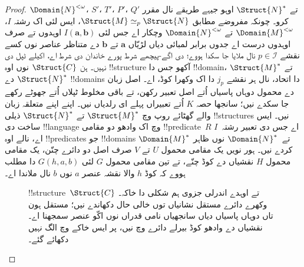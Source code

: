 \documentclass[../../../include/open-logic-section]{subfiles}
\begin{document}
\begin{proof}
$\Domain{N}^{<\omega}$، $S'$، $T'$، $P'$، $Q'$ تے
$\Struct{N}^*$ اوہو جیہے طریقے نال مقرر کرو۔ چونکہ مفروضے
مطابق $\Struct{M} \simeq_p
\Struct{N}$، ایس لئی اک رشتہ $I$،
$\Domain{M}^{<\omega}$ تے
$\Domain{N}^{<\omega}$ وچکار اے جس لئی
$I(\mathbf{a}, \mathbf{b})$ اوہدوں تے صرف اوہدوں درست اے
جدوں برابر لمبائی دیاں لڑیّاں $\mathbf{a}$ تے $\mathbf{b}$
دے متناظر عناصر نوں کسے نقشے $p\in\mathcal{I}$ نال ملایا جا سکدا ہووے؛
 دی اگے-پیچھے شرط
پورے خاندان دی شرط اے، اکیلے ٹپل دی نہیں۔ ہن $\Struct{C}$
نوں اوہ !!{structure} آکھو جس دا
!!{domain}، $\Struct{M}^*$ تے $\Struct{N}^*$ دے
!!{domain}s دا اتحاد، نال ہر نقشے $j_p$ دا اک وکھرا کوڈ، اے۔
اصل زبان دے محمول دوہاں پاسیاں اُتے اصل تعبیر رکھن، تے باقی
مخلوط ٹپلاں اُتے جھوٹے رکھے جا سکدے نیں؛ سانجھا حصہ $K$ اُتے
تعبیراں پہلے ای رلدیاں نیں۔ اپنے اپنے متعلقہ زبان والے گھٹائے روپ
وچ $\Struct{M}^*$ تے $\Struct{N}^*$ ذیلی !!{structure}s نیں۔
ایس ساخت دی
!!{language} وچ اک وادھو دو مقامی !!{predicate}~$R$ اے
جس دی تعبیر رشتہ~$I$ اے، نالے اوہ !!{predicate}s
جو !!{domain}s $\Domain{M}^*$ تے~$\Domain{N}^*$
نوں ظاہر کردے نیں۔ ہور نویں یک مقامی محمول $U$ تے $V$
صرف اصل دو دائرے چنّن، یک مقامی محمول $H$ نقشیاں دے کوڈ چنّے،
تے تین مقامی محمول $G$ لئی $G(h,a,b)$ دا مطلب ہووے کہ
کوڈ $h$ والا نقشہ عنصر $a$ نوں $b$ نال ملاندا اے۔

\begin{figure}[h]
  \centering
  \caption{!!{structure}~$\Struct{C}$ تے اوہدے اندرلی
    جزوی ہم شکلی دا خاکہ۔ وکھرے دائرے مستقل نشانیاں توں خالی حال
    دکھاندے نیں؛ مستقل ہون تاں دوہاں پاسیاں دیاں سانجھیاں نامی قدراں
    نوں اکّو عنصر سمجھنا اے۔ نقشیاں دے وادھو کوڈ بیرلے دائرے وچ نیں،
    پر ایس خاکے وچ الگ نہیں دکھائے گئے۔}
\end{figure}


\end{proof}
\end{document}
